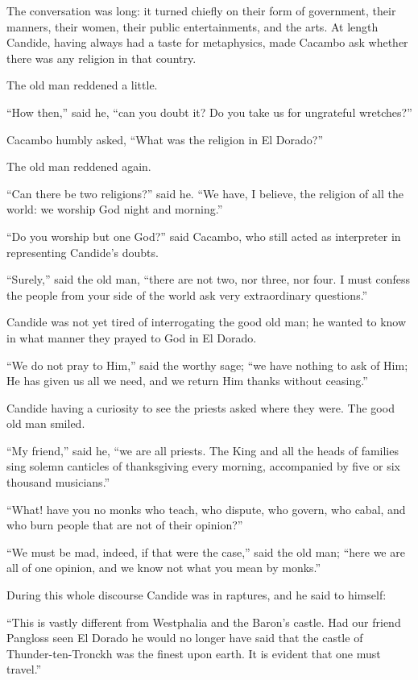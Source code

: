 The conversation was long: it turned chiefly on their form of government, their manners, their women, their public entertainments, and the arts. At length Candide, having always had a taste for metaphysics, made Cacambo ask whether there was any religion in that country.

The old man reddened a little.

``How then,'' said he, ``can you doubt it? Do you take us for ungrateful wretches?''

Cacambo humbly asked, ``What was the religion in El Dorado?''

The old man reddened again.

``Can there be two religions?'' said he. ``We have, I believe, the religion of all the world: we worship God night and morning.''

``Do you worship but one God?'' said Cacambo, who still acted as interpreter in representing Candide's doubts.

``Surely,'' said the old man, ``there are not two, nor three, nor four. I must confess the people from your side of the world ask very extraordinary questions.''

Candide was not yet tired of interrogating the good old man; he wanted to know in what manner they prayed to God in El Dorado.

``We do not pray to Him,'' said the worthy sage; ``we have nothing to ask of Him; He has given us all we need, and we return Him thanks without ceasing.''

Candide having a curiosity to see the priests asked where they were. The good old man smiled.

``My friend,'' said he, ``we are all priests. The King and all the heads of families sing solemn canticles of thanksgiving every morning, accompanied by five or six thousand musicians.''

``What! have you no monks who teach, who dispute, who govern, who cabal, and who burn people that are not of their opinion?''

``We must be mad, indeed, if that were the case,'' said the old man; ``here we are all of one opinion, and we know not what you mean by monks.''

During this whole discourse Candide was in raptures, and he said to himself:

``This is vastly different from Westphalia and the Baron's castle. Had our friend Pangloss seen El Dorado he would no longer have said that the castle of Thunder-ten-Tronckh was the finest upon earth. It is evident that one must travel.''

